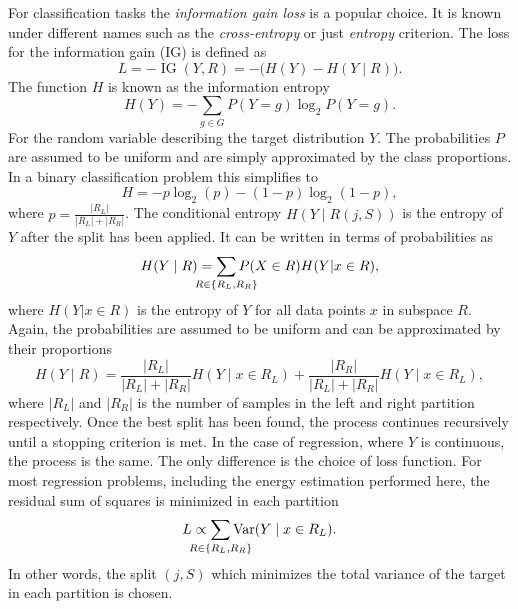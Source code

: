 For classification tasks the \emph{information gain loss} is a popular choice. 
It is known under different names such as the \emph{cross-entropy} or just \emph{entropy} criterion. 
The loss for the information gain (IG) is defined as
\begin{equation*}
    L = -\operatorname{IG}(Y, R) = -\bigl(H(Y) - H(Y \mid R)\bigr).
\end{equation*}
The function $H$ is known as the information entropy 
\begin{equation*}
  H(Y) = - \sum_{g \in G} P(Y=g) \log_2{P(Y=g)}.
\end{equation*}
For the random variable describing the target distribution $Y$. The probabilities $P$ are assumed to be uniform and are simply approximated by
the class proportions. In a binary classification problem this simplifies to
\begin{equation*}
    H = -p \log_2(p) - (1-p)\log_2(1-p),
\end{equation*}
where $p = \frac{|R_L|}{|R_L| + |R_R|}$.
The conditional entropy $H(Y \mid R(j, S))$ is the entropy of $Y$ after the split has been applied.
It can be written in terms of probabilities as
\begin{equation*}
    H(Y \mid R)  =  \sum_{\mathclap{R \in \{R_L, R_R\}}} P(X \in R) H(Y | x \in R),
\end{equation*}
where $H(Y | x \in R)$ is the entropy of $Y$ for all data points $x$ in subspace $R$.
Again, the probabilities are assumed to be uniform and can be approximated by their proportions
\begin{equation*}
    H(Y \mid R)  =  \frac{|R_L|}{|R_L| + |R_R|} H(Y \mid x \in R_L)  + \frac{|R_R|}{|R_L| + |R_R|} H(Y \mid x \in R_L),
\end{equation*}
where $|R_L|$ and $|R_R|$ is the number of samples in the left and right partition respectively.
Once the best split has been found, the process continues recursively until a stopping criterion is met.
In the case of regression, where $Y$ is continuous, the process is the same. The only difference is the choice of loss function.
For most regression problems, including the energy estimation performed here, the residual sum of squares is minimized in each partition
\begin{equation*}
    L \propto \sum_{\mathclap{R \in \{R_L, R_R\}}} \operatorname{Var}(Y \mid x \in R_L).
\end{equation*}
In other words, the split $(j, S)$ which minimizes the total variance of the target in each partition is chosen.

